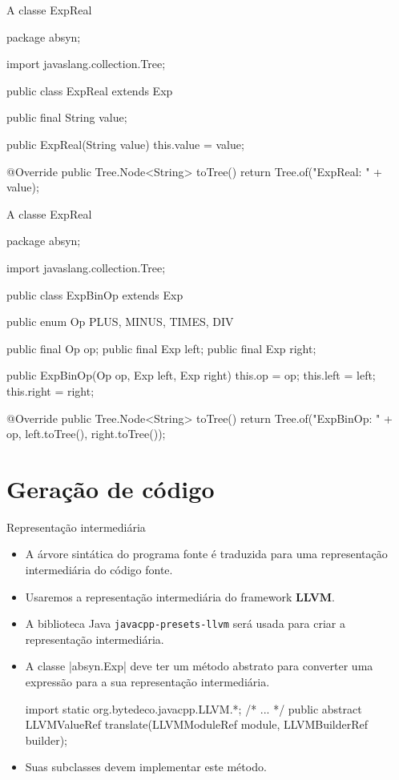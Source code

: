 \documentclass[smaller]{beamer}
\begin{document}
\begin{frame}{A classe ExpReal}
\begin{pygmented}[]
package absyn;

import javaslang.collection.Tree;

public class ExpReal extends Exp {

   public final String value;

   public ExpReal(String value) {
      this.value = value;
   }

   @Override
   public Tree.Node<String> toTree() {
      return Tree.of("ExpReal: " + value);
   }
}
\end{pygmented}
\end{frame}

\begin{frame}{A classe ExpReal}
\begin{pygmented}[]
package absyn;

import javaslang.collection.Tree;

public class ExpBinOp extends Exp {

   public enum Op {PLUS, MINUS, TIMES, DIV}

   public final Op op;
   public final Exp left;
   public final Exp right;

   public ExpBinOp(Op op, Exp left, Exp right) {
      this.op = op;
      this.left = left;
      this.right = right;
   }

   @Override
   public Tree.Node<String> toTree() {
      return Tree.of("ExpBinOp: " + op, left.toTree(), right.toTree());
   }
}
\end{pygmented}
\end{frame}


\section{Geração de código}

\begin{frame}{Representação intermediária}
  \begin{itemize}
    \item A árvore sintática do programa fonte é traduzida para uma
    representação intermediária do código fonte.
    \item Usaremos a representação intermediária do framework
    \textbf{LLVM}.
    \item A biblioteca Java \texttt{javacpp-presets-llvm} será usada
    para criar a representação intermediária.
    \item A classe \pyginline|absyn.Exp| deve ter um método abstrato
    para converter uma expressão para a sua representação
    intermediária.
\begin{pygmented}[]
import static org.bytedeco.javacpp.LLVM.*;
/* ... */
public abstract LLVMValueRef translate(LLVMModuleRef module,
                                       LLVMBuilderRef builder);
\end{pygmented}
    \item Suas subclasses devem implementar este método.
  \end{itemize}
\end{frame}
\end{document}
